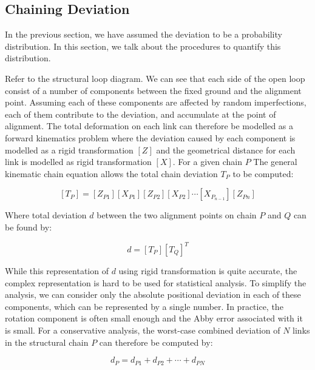 \subsection{Chaining Deviation}
\label{subsection:new_hypo_model_chaining_deviation}

In the previous section, we have assumed the deviation to be a probability distribution. In this section, we talk about the procedures to quantify this distribution. 

Refer to the structural loop diagram. We can see that each side of the open loop consist of a number of components between the fixed ground and the alignment point. Assuming each of these components are affected by random imperfections, each of them contribute to the deviation, and accumulate at the point of alignment. The total deformation on each link can therefore be modelled as a forward kinematics problem where the deviation caused by each component is modelled as a rigid transformation $[Z]$ and the geometrical distance for each link is modelled as rigid transformation $[X]$. For a given chain $P$ The general kinematic chain equation allows the total chain deviation $T_P$ to be computed:

\begin{equation} \label{eq:one_chain_deviation}
    [T_P] = [Z_{P1}][X_{P1}][Z_{P2}][X_{P2}] \cdots [X_{P_{n-1}}][Z_{Pn}] 
\end{equation}

Where total deviation $d$ between the two alignment points on chain $P$ and $Q$ can be found by:

\begin{equation} \label{eq:two_chain_deviation}
    d = [T_P][T_Q]^T 
\end{equation}

While this representation of $d$ using rigid transformation is quite accurate, the complex representation is hard to be used for statistical analysis. To simplify the analysis, we can consider only the absolute positional deviation in each of these components, which can be represented by a single number. In practice, the rotation component is often small enough and the Abby error associated with it is small. For a conservative analysis, the worst-case combined deviation of $N$ links in the structural chain $P$ can therefore be computed by:

\begin{equation}
    d_P = d_{P1} + d_{P2} + \cdots + d_{PN}
\end{equation}


